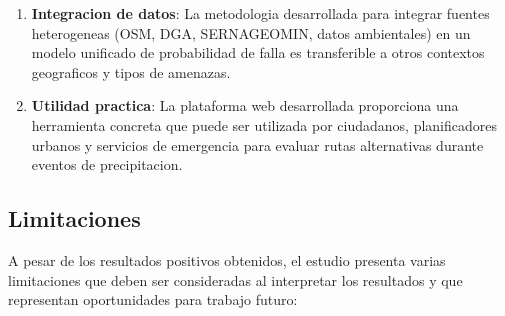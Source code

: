 \documentclass[conference]{IEEEtran}
\begin{document}
\begin{enumerate}
    \item \textbf{Integracion de datos}: La metodologia desarrollada para integrar fuentes heterogeneas (OSM, DGA, SERNAGEOMIN, datos ambientales) en un modelo unificado de probabilidad de falla es transferible a otros contextos geograficos y tipos de amenazas.

    \item \textbf{Utilidad practica}: La plataforma web desarrollada proporciona una herramienta concreta que puede ser utilizada por ciudadanos, planificadores urbanos y servicios de emergencia para evaluar rutas alternativas durante eventos de precipitacion.
\end{enumerate}

\subsection{Limitaciones}

A pesar de los resultados positivos obtenidos, el estudio presenta varias limitaciones que deben ser consideradas al interpretar los resultados y que representan oportunidades para trabajo futuro:
\end{document}
